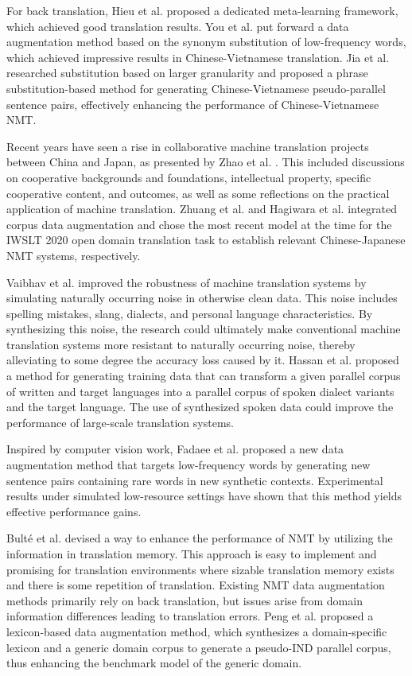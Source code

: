\documentclass[acmsmall]{acmart}
\begin{document}
For back translation, Hieu et al. \cite{n4-17} proposed a dedicated meta-learning framework, which achieved good translation results. You et al. \cite{n4-18} put forward a data augmentation method based on the synonym substitution of low-frequency words, which achieved impressive results in Chinese-Vietnamese translation. Jia et al. \cite{n4-19} researched substitution based on larger granularity and proposed a phrase substitution-based method for generating Chinese-Vietnamese pseudo-parallel sentence pairs, effectively enhancing the performance of Chinese-Vietnamese NMT.


Recent years have seen a rise in collaborative machine translation projects between China and Japan, as presented by Zhao et al. \cite{n4-20}. This included discussions on cooperative backgrounds and foundations, intellectual property, specific cooperative content, and outcomes, as well as some reflections on the practical application of machine translation. Zhuang et al. \cite{n4-21} and Hagiwara et al. \cite{n4-22} integrated corpus data augmentation and chose the most recent model at the time for the IWSLT 2020 open domain translation task to establish relevant Chinese-Japanese NMT systems, respectively. 

Vaibhav et al. \cite{n4-twelve12} improved the robustness of machine translation systems by simulating naturally occurring noise in otherwise clean data. This noise includes spelling mistakes, slang, dialects, and personal language characteristics. By synthesizing this noise, the research could ultimately make conventional machine translation systems more resistant to naturally occurring noise, thereby alleviating to some degree the accuracy loss caused by it. Hassan et al. \cite{n4-thirteen13} proposed a method for generating training data that can transform a given parallel corpus of written and target languages into a parallel corpus of spoken dialect variants and the target language. The use of synthesized spoken data could improve the performance of large-scale translation systems. 

Inspired by computer vision work, Fadaee et al. \cite{4-2b5} proposed a new data augmentation method that targets low-frequency words by generating new sentence pairs containing rare words in new synthetic contexts. Experimental results under simulated low-resource settings have shown that this method yields effective performance gains.

Bulté et al. \cite{n4-fourteen14} devised a way to enhance the performance of NMT by utilizing the information in translation memory. This approach is easy to implement and promising for translation environments where sizable translation memory exists and there is some repetition of translation. Existing NMT data augmentation methods primarily rely on back translation, but issues arise from domain information differences leading to translation errors. Peng et al. \cite{n4-fifteen15} proposed a lexicon-based data augmentation method, which synthesizes a domain-specific lexicon and a generic domain corpus to generate a pseudo-IND parallel corpus, thus enhancing the benchmark model of the generic domain. 
\end{document}

